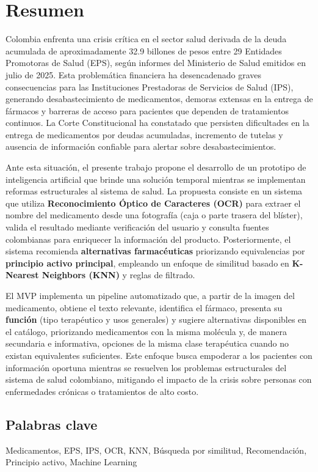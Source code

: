 \section*{Resumen}

Colombia enfrenta una crisis crítica en el sector salud derivada de la deuda acumulada de aproximadamente 32.9 billones de pesos entre 29 Entidades Promotoras de Salud (EPS), según informes del Ministerio de Salud emitidos en julio de 2025. Esta problemática financiera ha desencadenado graves consecuencias para las Instituciones Prestadoras de Servicios de Salud (IPS), generando desabastecimiento de medicamentos, demoras extensas en la entrega de fármacos y barreras de acceso para pacientes que dependen de tratamientos continuos. La Corte Constitucional ha constatado que persisten dificultades en la entrega de medicamentos por deudas acumuladas, incremento de tutelas y ausencia de información confiable para alertar sobre desabastecimientos.

Ante esta situación, el presente trabajo propone el desarrollo de un prototipo de inteligencia artificial que brinde una solución temporal mientras se implementan reformas estructurales al sistema de salud. La propuesta consiste en un sistema que utiliza \textbf{Reconocimiento Óptico de Caracteres (OCR)} para extraer el nombre del medicamento desde una fotografía (caja o parte trasera del blíster), valida el resultado mediante verificación del usuario y consulta fuentes colombianas para enriquecer la información del producto. Posteriormente, el sistema recomienda \textbf{alternativas farmacéuticas} priorizando equivalencias por \textbf{principio activo principal}, empleando un enfoque de similitud basado en \textbf{K-Nearest Neighbors (KNN)} y reglas de filtrado.

El MVP implementa un pipeline automatizado que, a partir de la imagen del medicamento, obtiene el texto relevante, identifica el fármaco, presenta su \textbf{función} (tipo terapéutico y usos generales) y sugiere alternativas disponibles en el catálogo, priorizando medicamentos con la misma molécula y, de manera secundaria e informativa, opciones de la misma clase terapéutica cuando no existan equivalentes suficientes. Este enfoque busca empoderar a los pacientes con información oportuna mientras se resuelven los problemas estructurales del sistema de salud colombiano, mitigando el impacto de la crisis sobre personas con enfermedades crónicas o tratamientos de alto costo.

\subsection*{Palabras clave}
Medicamentos, EPS, IPS, OCR, KNN, Búsqueda por similitud, Recomendación, Principio activo, Machine Learning

